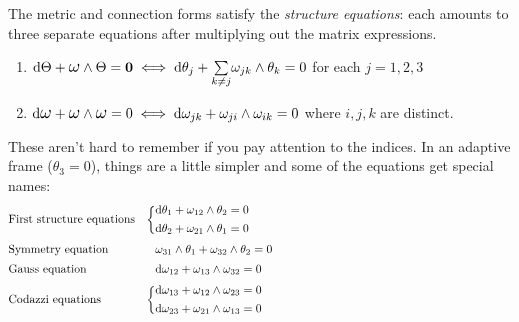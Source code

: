 \begin{thm}{}{}
The metric and connection forms satisfy the \emph{structure equations}: each amounts to three separate equations after multiplying out the matrix expressions.
\begin{enumerate}
  \item $\D\Theta+\lomega\wedge\Theta=\V0\iff \D\theta_j+{\sum\limits_{k\neq j}}\omega_{jk}\wedge\theta_k=0$ for each $j=1,2,3$
  \item $\D\lomega+\lomega\wedge\lomega=0\iff \D\omega_{jk}+\omega_{ji}\wedge\omega_{ik}=0$ where $i,j,k$ are distinct.
\end{enumerate}
\end{thm}
These aren't hard to remember if you pay attention to the indices.
In an adaptive frame ($\theta_3=0$), things are a little simpler and some of the equations get special names:
\begin{align*}
&\text{First structure equations} &\bigg\{&\begin{array}{@{}c}
\D\theta_1+\omega_{12}\wedge\theta_2=0\\[4pt]
\D\theta_2+\omega_{21}\wedge\theta_1=0
\end{array} \hspace{220pt}\\[2pt]
&\text{Symmetry equation}&&\omega_{31}\wedge\theta_1+\omega_{32}\wedge\theta_2=0\\[2pt]
&\text{Gauss equation}&&\D\omega_{12}+\omega_{13}\wedge\omega_{32}=0\\[2pt]
&\text{Codazzi equations}&\bigg\{&\begin{array}{@{}c}
\D\omega_{13}+\omega_{12}\wedge\omega_{23}=0\\[4pt]
\D\omega_{23}+\omega_{21}\wedge\omega_{13}=0
\end{array}
\end{align*}

\goodbreak


